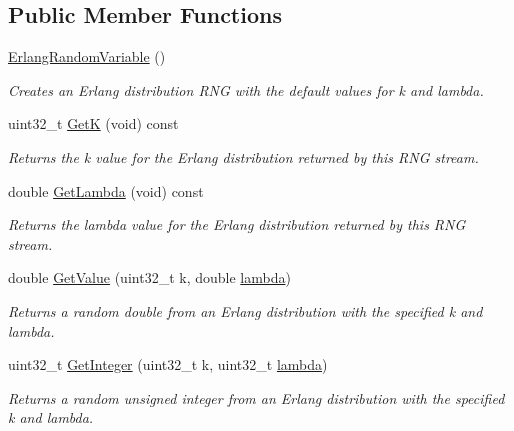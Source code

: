 \subsection*{Public Member Functions}
\begin{DoxyCompactItemize}
\item 
\hyperlink{classns3_1_1ErlangRandomVariable_affed2d0031f241c8c22a999cf07bd9b2}{Erlang\+Random\+Variable} ()
\begin{DoxyCompactList}\small\item\em Creates an Erlang distribution R\+NG with the default values for k and lambda. \end{DoxyCompactList}\item 
uint32\+\_\+t \hyperlink{classns3_1_1ErlangRandomVariable_a3c778a8da2f315f4230391e2408a50c9}{GetK} (void) const 
\begin{DoxyCompactList}\small\item\em Returns the k value for the Erlang distribution returned by this R\+NG stream. \end{DoxyCompactList}\item 
double \hyperlink{classns3_1_1ErlangRandomVariable_a888082b78ee85b24544de0ebceaa9086}{Get\+Lambda} (void) const 
\begin{DoxyCompactList}\small\item\em Returns the lambda value for the Erlang distribution returned by this R\+NG stream. \end{DoxyCompactList}\item 
double \hyperlink{classns3_1_1ErlangRandomVariable_a144e603fbee33b5167339f90d4dd4a57}{Get\+Value} (uint32\+\_\+t k, double \hyperlink{loss__ITU1411__NLOS__over__rooftop_8m_aca36b09d6e71a60cfa3837d7e24c07ca}{lambda})
\begin{DoxyCompactList}\small\item\em Returns a random double from an Erlang distribution with the specified k and lambda. \end{DoxyCompactList}\item 
uint32\+\_\+t \hyperlink{classns3_1_1ErlangRandomVariable_ac09b5763ce698aed7dd662f9459ecd9a}{Get\+Integer} (uint32\+\_\+t k, uint32\+\_\+t \hyperlink{loss__ITU1411__NLOS__over__rooftop_8m_aca36b09d6e71a60cfa3837d7e24c07ca}{lambda})
\begin{DoxyCompactList}\small\item\em Returns a random unsigned integer from an Erlang distribution with the specified k and lambda. \end{DoxyCompactList}\item 

\end{DoxyCompactItemize}

